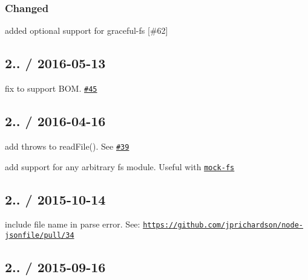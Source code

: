 \subsubsection*{Changed}


\begin{DoxyItemize}
\item added optional support for {\ttfamily graceful-\/fs} \mbox{[}\#62\mbox{]}
\end{DoxyItemize}

\subsection*{2.. / 2016-\/05-\/13 }


\begin{DoxyItemize}
\item fix to support B\+OM. \href{https://github.com/jprichardson/node-jsonfile/issues/45}{\tt \#45}
\end{DoxyItemize}

\subsection*{2.. / 2016-\/04-\/16 }


\begin{DoxyItemize}
\item add {\ttfamily throws} to {\ttfamily read\+File()}. See \href{https://github.com/jprichardson/node-jsonfile/pull/39}{\tt \#39}
\item add support for any arbitrary {\ttfamily fs} module. Useful with \href{https://www.npmjs.com/package/mock-fs}{\tt mock-\/fs}
\end{DoxyItemize}

\subsection*{2.. / 2015-\/10-\/14 }


\begin{DoxyItemize}
\item include file name in parse error. See\+: \href{https://github.com/jprichardson/node-jsonfile/pull/34}{\tt https\+://github.\+com/jprichardson/node-\/jsonfile/pull/34}
\end{DoxyItemize}

\subsection*{2.. / 2015-\/09-\/16 }


